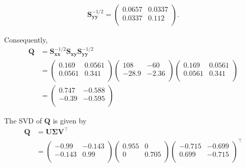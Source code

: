 \documentclass[]{book}
\theoremstyle{definition}
\theoremstyle{definition}
\theoremstyle{definition}
\theoremstyle{remark}
\begin{document}
\begin{align*}
\boldsymbol S_{\boldsymbol y\boldsymbol y}^{-1/2}= \begin{pmatrix}0.0657&0.0337 \\0.0337&0.112 \\\end{pmatrix}.
\end{align*}

Consequently,
\begin{align*}
\boldsymbol Q&=\boldsymbol S_{\boldsymbol x\boldsymbol x}^{-1/2}\boldsymbol S_{\boldsymbol x\boldsymbol y}\boldsymbol S_{\boldsymbol y\boldsymbol y}^{-1/2}\\
&=\begin{pmatrix}0.169&0.0561 \\0.0561&0.341 \\\end{pmatrix} \begin{pmatrix}108&-60 \\-28.9&-2.36 \\\end{pmatrix}\begin{pmatrix}0.169&0.0561 \\0.0561&0.341 \\\end{pmatrix}\\
&=\begin{pmatrix}0.747&-0.588 \\-0.39&-0.595 \\\end{pmatrix}
\end{align*}

The SVD of \(\boldsymbol Q\) is given by
\begin{align}
\boldsymbol Q&=\boldsymbol U{\pmb \Sigma} \boldsymbol V^\top \nonumber \\
&=\begin{pmatrix}-0.99&-0.143 \\-0.143&0.99 \\\end{pmatrix} \begin{pmatrix}0.955&0 \\0&0.705 \\\end{pmatrix}\begin{pmatrix}-0.715&-0.699 \\0.699&-0.715 \\\end{pmatrix}^\top
\label{eq:SVDanalysis}
\end{align}
\end{document}

